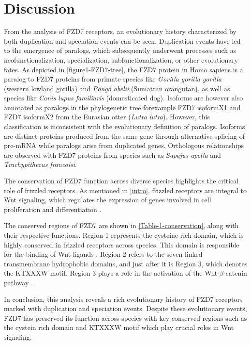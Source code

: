 \documentclass[11pt, a4paper]{article}
\begin{document}
\section{Discussion}
From the analysis of FZD7 receptors, an evolutionary history characterized by both duplication and speciation events can be seen. Duplication events have led to the emergence of paralogs, which subsequently underwent processes such as neofunctionalization, specialization, subfunctionalization, or other evolutionary fates. As depicted in \autoref{figure1-FZD7-tree}, the FZD7 protein in Homo sapiens is a paralog to FZD7 proteins from primate species like \textit{Gorilla gorilla gorilla} (western lowland gorilla) and \textit{Pongo abelii} (Sumatran orangutan), as well as species like \textit{Canis lupus familiaris} (domesticated dog). Isoforms are however also annotated as paralogs in the phylogenetic tree forexample FZD7 isoformX1 and FZD7 isoformX2 from the Eurasian otter (\textit{Lutra lutra}). However, this classification is inconsistent with the evolutionary definition of paralogs. Isoforms are distinct proteins produced from the same gene through alternative splicing of pre-mRNA while paralogs arise from duplicated genes. Orthologous relationships are observed with FZD7 proteins from species such as \textit{Sapajus apella} and \textit{Trachypithecus francoisi}.

\noindent The conservation of FZD7 function across diverse species highlights the critical role of frizzled receptors. As mentioned in \autoref{intro}, frizzled receptors are integral to Wnt signaling, which regulates the expression of genes involved in cell proliferation and differentiation \cite{Liu2022-kj}.

\noindent The conserved regions of FZD7 are shown in \autoref{Table-1-conservation}, along with their respective functions. Region 1 represents the cysteine-rich domain, which is highly conserved in frizzled receptors across species. This domain is responsible for the binding of Wnt ligands \cite{Huang2004-zi}. Region 2 refers to the seven linked transmembrane hydrophobic domains, and just after it is Region 3, which denotes the KTXXXW motif. Region 3 plays a role in the activation of the Wnt-$\beta$-catenin pathway \cite{Huang2004-zi}.

\noindent In conclusion, this analysis reveals a rich evolutionary history of FZD7 receptors marked with duplication and speciation events. Despite these evolutionary events, FZD7 has preserved its function across species with key conserved regions such as the cystein rich domain and KTXXXW motif which play crucial roles in Wnt signaling.
\printbibliography
\appendix
\end{document}

